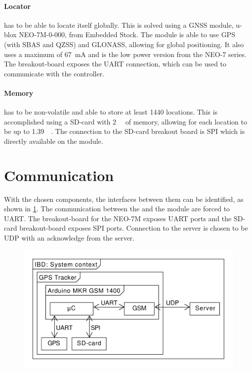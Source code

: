 \paragraph{Locator} has to be able to locate itself globally. This is solved using a GNSS module, u-blox NEO-7M-0-000, from Embedded Stock.
The module is able to use GPS (with SBAS and QZSS) and GLONASS, allowing for global positioning.
It also uses a maximum of \SI{67}{\milli\ampere} \cite[p.~17]{NEO7_Data} and is the low power version from the NEO-7 series.
The breakout-board exposes the UART connection, which can be used to communicate with the controller.

\paragraph{Memory} has to be non-volatile and able to store at least 1440 locations.
This is accomplished using a SD-card with \SI{2}{\giga\byte} of memory, allowing for each location to be up to \SI{1.39}{\mega\byte}.
The connection to the SD-card breakout board is SPI which is directly available on the \MKR module.

\section{Communication}
With the chosen components, the interfaces between them can be identified, as shown in \cref{fig:IBD:overall}.
The communication between the \SAMD and the \SARA module are forced to UART.
The breakout-board for the NEO-7M exposes UART ports and the SD-card breakout-board exposes SPI ports.
Connection to the server is chosen to be UDP with an acknowledge from the server.

\begin{figure}
	\centering
	\includegraphics[width=0.7\linewidth]{gfx/Design/Overall_IBD.pdf}
	\caption{}
	\label{fig:IBD:overall}
\end{figure}


